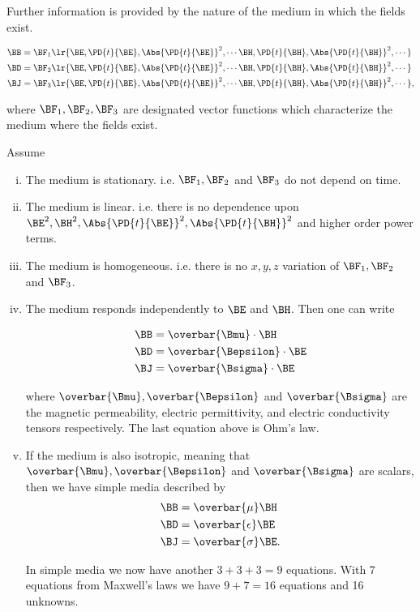 Further information is provided by the nature of the medium in which the fields exist.

\begin{equation}\label{eqn:uwavesLecture1:720}
\begin{aligned}
\BB &= \BF_1\lr{ \BE, \PD{t}{\BE}, \Abs{\PD{t}{\BE}}^2, \cdots \BH, \PD{t}{\BH}, \Abs{\PD{t}{\BH}}^2, \cdots } \\
\BD &= \BF_2\lr{ \BE, \PD{t}{\BE}, \Abs{\PD{t}{\BE}}^2, \cdots \BH, \PD{t}{\BH}, \Abs{\PD{t}{\BH}}^2, \cdots } \\
\BJ &= \BF_3\lr{ \BE, \PD{t}{\BE}, \Abs{\PD{t}{\BE}}^2, \cdots \BH, \PD{t}{\BH}, \Abs{\PD{t}{\BH}}^2, \cdots },
\end{aligned}
\end{equation}

where \( \BF_1, \BF_2, \BF_3 \) are designated vector functions which characterize the medium where the fields exist.

Assume 

\begin{enumerate}[(i)]
\item The medium is stationary.  i.e. \( \BF_1, \BF_2 \) and \( \BF_3 \) do not depend on time.
\item The medium is linear.  i.e. there is no dependence upon \( \BE^2, \BH^2, \Abs{\PD{t}{\BE}}^2, \Abs{\PD{t}{\BH}}^2 \) and higher order power terms.
\item The medium is homogeneous.  i.e. there is no \( x, y, z\) variation of \( \BF_1, \BF_2 \) and \( \BF_3 \).
\item The medium responds independently to \( \BE \) and \( \BH \).  Then one can write

\begin{equation}\label{eqn:uwavesLecture1:740}
\begin{aligned}
\BB &= \overbar{\Bmu} \cdot \BH \\
\BD &= \overbar{\Bepsilon} \cdot \BE \\
\BJ &= \overbar{\Bsigma} \cdot \BE
\end{aligned}
\end{equation}

where \( \overbar{\Bmu}, \overbar{\Bepsilon} \) and \( \overbar{\Bsigma} \) are the magnetic permeability, electric permittivity, and electric conductivity tensors respectively.  The last equation above is Ohm's law.
\item If the medium is also isotropic, meaning that \( \overbar{\Bmu}, \overbar{\Bepsilon} \) and \( \overbar{\Bsigma} \) are scalars, then we have simple media described by
\begin{equation}\label{eqn:uwavesLecture1:760}
\begin{aligned}
\BB &= \overbar{\mu}  \BH \\
\BD &= \overbar{\epsilon}  \BE \\
\BJ &= \overbar{\sigma}  \BE.
\end{aligned}
\end{equation}

In simple media we now have another \( 3 + 3 + 3 = 9 \) equations.  With 7 equations from Maxwell's laws we have \( 9 + 7 = 16 \) equations and 16 unknowns.
\end{enumerate}

